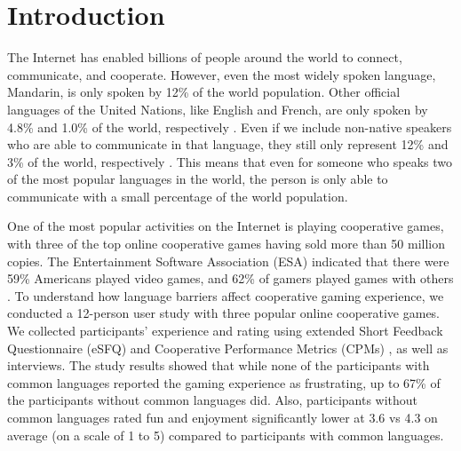\section{Introduction}

The Internet has enabled billions of people around the world to connect, communicate, and cooperate. However, even the most widely spoken language, Mandarin, is only spoken by 12\% of the world population. 
Other official languages of the United Nations, like English and French, are only spoken by 4.8\% and 1.0\% of the world, respectively \cite{I1}. 
Even if we include non-native speakers who are able to communicate in that language, they still only represent 12\% and 3\% of the world, respectively \cite{I2,I3}. This means that even for someone who speaks two of the most popular languages in the world, the person is only able to communicate with a small percentage of the world population.

One of the most popular activities on the Internet is playing cooperative games, with three of the top online cooperative games having sold more than 50 million copies. The Entertainment Software Association (ESA) indicated that there were 59\% Americans played video games, and 62\% of gamers played games with others \cite{I4}. To understand how language barriers affect cooperative gaming experience, we conducted a 12-person user study with three popular online cooperative games. We collected participants' experience and rating using extended Short Feedback Questionnaire (eSFQ) \cite{eSFQ} and Cooperative Performance Metrics (CPMs) \cite{CPMs}, as well as interviews. The study results showed that while none of the participants with common languages reported the gaming experience as frustrating, up to 67\% of the participants without common languages did. Also, participants without common languages rated fun and enjoyment significantly lower at 3.6 vs 4.3 on average (on a scale of 1 to 5) compared to participants with common languages. 

